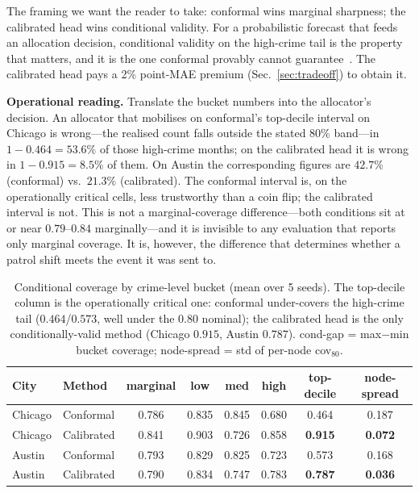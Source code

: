 \documentclass[11pt,conference]{IEEEtran}
\begin{document}
The framing we want the reader to take: conformal wins marginal sharpness; the
calibrated head wins conditional validity. For a probabilistic forecast that
feeds an allocation decision, conditional validity on the high-crime tail is the
property that matters, and it is the one conformal provably cannot
guarantee~\cite{romano2019cqr,gneiting2007calibration}. The calibrated head pays
a 2\% point-MAE premium (Sec.~\ref{sec:tradeoff}) to obtain it.

\textbf{Operational reading.} Translate the bucket numbers into the allocator's
decision. An allocator that mobilises on conformal's top-decile interval on
Chicago is wrong---the realised count falls outside the stated 80\% band---in
$1-0.464=53.6\%$ of those high-crime months; on the calibrated head it is wrong
in $1-0.915=8.5\%$ of them. On Austin the corresponding figures are
$42.7\%$ (conformal) vs.\ $21.3\%$ (calibrated). The conformal interval is, on
the operationally critical cells, less trustworthy than a coin flip; the
calibrated interval is not. This is not a marginal-coverage difference---both
conditions sit at or near $0.79$--$0.84$ marginally---and it is invisible to any
evaluation that reports only marginal coverage. It is, however, the difference
that determines whether a patrol shift meets the event it was sent to.

\begin{table}[t]
\centering
\caption{Conditional coverage by crime-level bucket (mean over 5 seeds). The
top-decile column is the operationally critical one: conformal under-covers the
high-crime tail ($0.464$/$0.573$, well under the 0.80 nominal); the calibrated
head is the only conditionally-valid method (Chicago $0.915$, Austin $0.787$).
cond-gap = max$-$min bucket coverage; node-spread = std of per-node cov$_{80}$.}
\label{tab:condcal}
\small
\begin{tabular}{llcccccc}
\toprule
City & Method & marginal & low & med & high & top-decile & node-spread\\
\midrule
Chicago & Conformal   & 0.786 & 0.835 & 0.845 & 0.680 & 0.464 & 0.187\\
Chicago & Calibrated  & 0.841 & 0.903 & 0.726 & 0.858 & \textbf{0.915} & \textbf{0.072}\\
\midrule
Austin  & Conformal   & 0.793 & 0.829 & 0.825 & 0.723 & 0.573 & 0.168\\
Austin  & Calibrated  & 0.790 & 0.834 & 0.747 & 0.783 & \textbf{0.787} & \textbf{0.036}\\
\bottomrule
\end{tabular}
\end{table}
\end{document}
